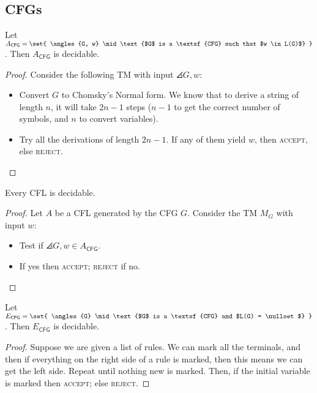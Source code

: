 \documentclass{standalone}
\begin{document}
\subsection{CFGs}
\begin{proposition}
  Let \(A_{\textsf{CFG}} = \set{
    \angles{G, w} \mid \text{$G$ is a \textsf{CFG} such that $w \in L(G)$}
  }\). Then \(A_{\textsf{CFG}}\) is decidable.
\end{proposition}
\begin{proof}
  Consider the following \textsf{TM} with input \(\angles{G, w}\):
  \begin{itemize}
    \item Convert \(G\) to Chomsky's Normal form.
          We know that to derive a string of length $n$,
          it will take \(2n - 1\) steps
          (\(n - 1\) to get the correct number of symbols,
          and \(n\) to convert variables).
    \item Try all the derivations of length \(2n - 1\).
          If any of them yield \(w\), then \textsc{accept},
          else \textsc{reject}. \qedhere
  \end{itemize}
\end{proof}

\begin{proposition}
  Every \textsf{CFL} is decidable.
\end{proposition}
\begin{proof}
  Let \(A\) be a \textsf{CFL} generated by the \textsf{CFG} \(G\).
  Consider the \textsf{TM} \(M_G\) with input \(w\):
  \begin{itemize}
    \item Test if \(\angles{G, w} \in A_{\textsf{CFG}}\).
    \item If yes then \textsc{accept}; \textsc{reject} if no. \qedhere
  \end{itemize}
\end{proof}

\begin{proposition}
  Let \(E_{\textsf{CFG}} = \set{
    \angles{G} \mid \text{$G$ is a \textsf{CFG} and $L(G) = \nullset$}
  }\). Then \(E_{\textsf{CFG}}\) is decidable.
\end{proposition}
\begin{proof}
  Suppose we are given a list of rules.
  We can mark all the terminals,
  and then if everything on the right side of a rule is marked,
  then this means we can get the left side.
  Repeat until nothing new is marked.
  Then, if the initial variable is marked then \textsc{accept};
  else \textsc{reject}.
\end{proof}
\end{document}
